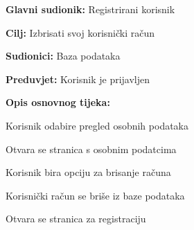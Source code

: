 	\noindent {}
	\begin{packed_item}
		
		\item \textbf{Glavni sudionik: }Registrirani korisnik
		\item  \textbf{Cilj:} Izbrisati svoj korisnički račun
		\item  \textbf{Sudionici:} Baza podataka
		\item  \textbf{Preduvjet:} Korisnik je prijavljen
		\item  \textbf{Opis osnovnog tijeka:}
		
		\item[] \begin{packed_enum}
			
			\item  Korisnik odabire pregled osobnih podataka
			\item Otvara se stranica s osobnim podatcima
			\item Korisnik bira opciju za brisanje računa
			\item Korisnički račun se briše iz baze podataka
			\item Otvara se stranica za registraciju
			
		\end{packed_enum}
	\end{packed_item}


